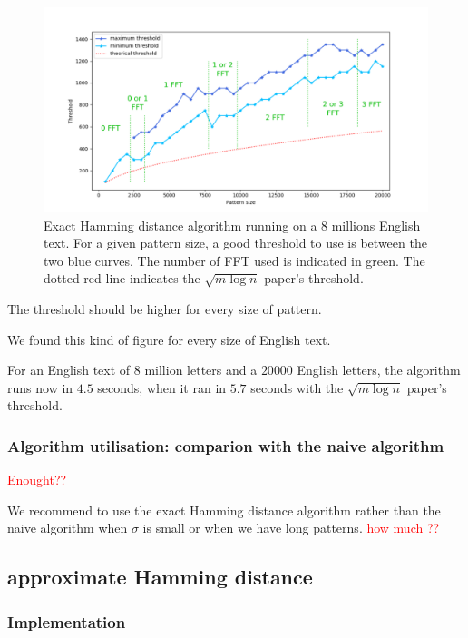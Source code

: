 \documentclass[preprint,12pt]{elsarticle}
\begin{document}
\begin{figure}[h]
\includegraphics[scale=0.56]{./figures/ExHDThresholdAll.png}
\caption{Exact Hamming distance algorithm
running on a $8$ millions English text.
For a given pattern size,
a good threshold to use is between the two blue curves.
The number of FFT used is indicated in green.
The dotted red line indicates the $\sqrt{m \log n}$ paper's threshold.}
\label{ExHDThreshAll}
\end{figure}


The threshold should be higher for every size of pattern.

We found this kind of figure for every size of English text.

For an English text of $8$ million letters and a $20 000$ English letters,
the algorithm runs now in $4.5$ seconds, 
when it ran in $5.7$ seconds with the $\sqrt{m \log n}$ paper's threshold.

\subsubsection*{Algorithm utilisation: comparion with the naive algorithm}

\textcolor{red}{Enought??}

We recommend to use the exact Hamming distance algorithm rather than the naive algorithm
when $\sigma$ is small or when we have long patterns. \textcolor{red}{how much ??}


\subsection{approximate Hamming distance}

\subsubsection*{Implementation}
\end{document}
